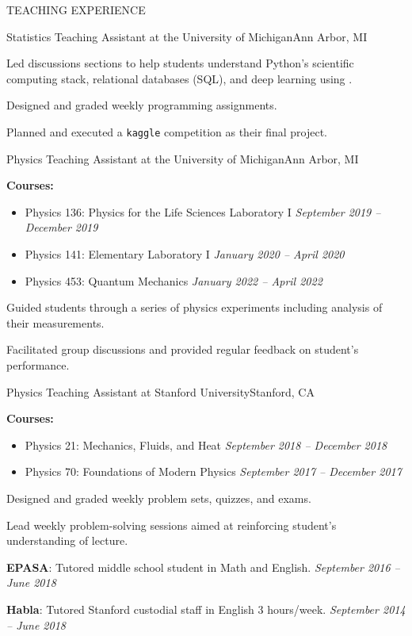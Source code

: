 \begin{rSection}{TEACHING EXPERIENCE}
\begin{rSubsection}{Statistics Teaching Assistant at the University of Michigan}{Ann Arbor, MI}{}{}
\item Led discussions sections to help students understand Python's scientific computing stack, relational databases (SQL), and deep learning using \pytorch.
\item Designed and graded weekly programming assignments.
\item Planned and executed a \texttt{kaggle} competition as their final project.
%
\end{rSubsection} 
%
\begin{rSubsection}{Physics Teaching Assistant at the University of Michigan}{Ann Arbor, MI}{}{}
\item \textbf{Courses:}
%
    \begin{itemize}[itemsep=-0.4em]
        \vspace*{-0.5em}
        \item Physics 136: Physics for the Life Sciences Laboratory I \hfill \textit{September 2019 -- December 2019}
        \item Physics 141: Elementary Laboratory I \hfill \textit{January 2020 -- April 2020}
        \item Physics 453: Quantum Mechanics \hfill \textit{January 2022 -- April 2022}
    \end{itemize}
%
\item Guided students through a series of physics experiments including analysis of their measurements.
\item Facilitated group discussions and provided regular feedback on student's performance. 
\end{rSubsection} 
%
\begin{rSubsection}{Physics Teaching Assistant at Stanford University}{Stanford, CA}{}{}
\item \textbf{Courses:}
%
    \begin{itemize}[itemsep=-0.5em]
        \vspace*{-0.5em}
        \item Physics 21: Mechanics, Fluids, and Heat \hfill \textit{September 2018 -- December 2018}
        \item Physics 70: Foundations of Modern Physics \hfill \textit{September 2017 -- December 2017}
    \end{itemize}
%
\item Designed and graded weekly problem sets, quizzes, and exams. 
\item Lead weekly problem-solving sessions aimed at reinforcing student's understanding of lecture. 
%
\end{rSubsection} 
%
\textbf{EPASA}: Tutored middle school student in Math and English. \hfill {\em September 2016 -- June 2018}

\vspace*{-.15cm}
\textbf{Habla}: Tutored Stanford custodial staff in English 3 hours/week. \hfill {\em September 2014 -- June 2018}
\end{rSection}

